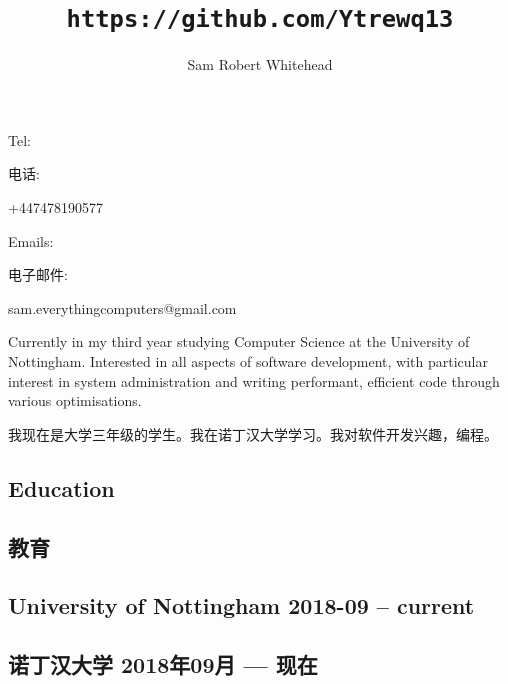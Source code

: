     \title{\texttt{https://github.com/Ytrewq13}}
    \author{Sam Robert Whitehead}

    \maketitle

    \pagestyle{empty}

\begin{xen}
    Tel:
\end{xen}
\begin{xcn}
    电话:
\end{xcn}
    +447478190577
    \hfill
\begin{xen}
    Emails:
\end{xen}
\begin{xcn}
    电子邮件:
\end{xcn}
    sam.everythingcomputers@gmail.com\\
    {}
    \vspace{1mm}
\begin{xen}
    Currently in my third year studying Computer Science at the University of
    Nottingham. Interested in all aspects of software development, with
    particular interest in system administration and writing performant,
    efficient code through various optimisations.
\end{xen}
\begin{xcn}
    我现在是大学三年级的学生。我在诺丁汉大学学习。我对软件开发兴趣，编程。
\end{xcn}
\begin{xen}
    \section{Education}
\end{xen}
\begin{xcn}
    \section{教育}
\end{xcn}
\begin{xen}
    \subsection{University of Nottingham
        \hfill 2018-09 -- current}
\end{xen}
\begin{xcn}
        \subsection{诺丁汉大学
        \hfill 2018年09月 --- 现在}
\end{xcn}
